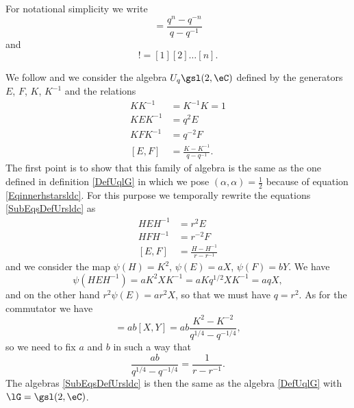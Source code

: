 For notational simplicity we write
\begin{equation}
    [n]=\frac{ q^{n}-q^{-n} }{ q-q^{-1} }
\end{equation}
and 
\begin{equation}
    [n]!=[1][2]\ldots [n].
\end{equation}

We follow \cite{Kassel} and we consider the algebra \( U_q\gsl(2,\eC)\) defined by the generators \( E\), \( F\), \( K\), \( K^{-1}\) and the relations
\begin{subequations}        \label{SubEqsDefUrsldc}
    \begin{align}
        KK^{-1}&=K^{-1}K=1      \\
        KEK^{-1}&=q^2E          \label{EqUqslKEK}\\
        KFK^{-1}&=q^{-2}F       \label{EqsiKFKqdGF}\\
        [E,F]&=\frac{ K-K^{-1} }{ q-q^{-1} }.
    \end{align}
\end{subequations}
The first point is to show that this family of algebra is the same as the one defined in definition \ref{DefUqlG} in which we pose \( (\alpha,\alpha)=\frac{ 1 }{2}\) because of equation \eqref{Eqinnerhstarsldc}. For this purpose we temporally rewrite the equations \eqref{SubEqsDefUrsldc} as
\begin{subequations}
    \begin{align}
        HEH^{-1}&=r^2E\\
        HFH^{-1}&=r^{-2}F\\
        [E,F]&=\frac{ H-H^{-1} }{ r-r^{-1} }
    \end{align}
\end{subequations}
and we consider the map \( \psi(H)=K^2\), \( \psi(E)=aX\), \( \psi(F)=bY\). We have
\begin{equation}
    \psi(HEH^{-1})=aK^2XK^{-1}=aKq^{1/2}XK^{-1}=aqX,
\end{equation}
and on the other hand \( r^2\psi(E)=ar^2X\), so that we must have \( q=r^2\). As for the commutator we have
\begin{equation}
    [\psi(E),\psi(F)]=ab[X,Y]=ab\frac{ K^{2}-K^{-2} }{ q^{1/4}-q^{-1/4} },
\end{equation}
so we need to fix \( a\) and \( b\) in such a way that 
\begin{equation}
    \frac{ ab }{ q^{1/4}-q^{-1/4} }=\frac{1}{ r-r^{-1} }.
\end{equation}
The algebras \eqref{SubEqsDefUrsldc} is then the same as the algebra \eqref{DefUqlG} with \( \lG=\gsl(2,\eC)\).

